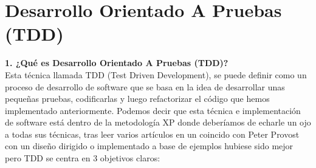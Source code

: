 \section{Desarrollo Orientado A Pruebas (TDD)} 
\textbf {1.    ¿Qué es Desarrollo Orientado A Pruebas (TDD)?}
\textbf{}\\
Esta técnica llamada TDD (Test Driven Development), se puede definir como un proceso de desarrollo de software que se basa en la idea de desarrollar unas pequeñas pruebas, codificarlas y luego refactorizar el código que hemos implementado anteriormente.
Podemos decir que esta técnica e implementación de software está dentro de la metodología XP donde deberíamos de echarle un ojo a todas sus técnicas, tras leer varios artículos en un coincido con Peter Provost con un diseño dirigido o implementado a base de ejemplos hubiese sido mejor pero TDD se centra en 3 objetivos claros:

